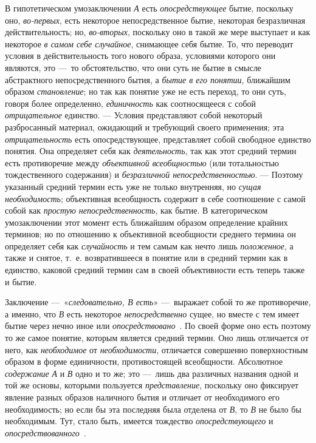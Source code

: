 \documentclass[twoside]{article}
\begin{document}
{{{{{{В гипотетическом умозаключении
{\em А} есть
{\em опосредствующее}
бытие, поскольку оно,
{\em во-первых}, есть
некоторое непосредственное бытие, некоторая безразличная действительность;
но, {\em во-вторых},
поскольку оно в такой же мере выступает и как некоторое
{\em в самом себе случайное},
снимающее себя бытие. То, что переводит условия в
действительность того нового образа, условиями которого они являются, это
—~то обстоятельство, что они суть не бытие в смысле
абстрактного непосредственного бытия, а
{\em бытие в его понятии},
ближайшим образом
{\em становление}; но так
как понятие уже не есть переход, то они суть, говоря более определенно,
{\em единичность} как
соотносящееся с собой
{\em отрицательное}
единство. — Условия
представляют собой некоторый разбросанный материал,
ожидающий и требующий своего применения; эта
{\em отрицательность}
есть опосредствующее, представляет собой свободное единство
понятия. Она определяет себя как
{\em деятельность}, так
как этот средний термин есть противоречие между
{\em объективной всеобщностью}
(или тотальностью тождественного содержания) и
{\em безразличной непосредственностью}.
— Поэтому указанный средний термин есть уже не только
внутренняя, но {\em сущая
необходимость}; объективная всеобщность содержит в себе
соотношение с самой собой как
{\em простую непосредственность},
как бытие. В категорическом умозаключении этот момент есть
ближайшим образом определение крайних терминов; но по отношению к
объективной всеобщности среднего термина он определяет себя как
{\em случайность} и тем
самым как нечто лишь {\em положенное},
а также и снятое, т.~е. возвратившееся в понятие или в
средний термин как в единство, каковой средний термин сам в своей
объективности есть теперь также и бытие.

Заключение
—~«{\em следовательно, В есть}»
—~выражает собой то же противоречие, а именно, что
{\em В} есть некоторое
{\em непосредственно}
сущее, но вместе с тем имеет бытие через нечно иное или
{\em опосредствовано}~\label{bkm:bm61}.
По своей форме оно есть поэтому то же самое понятие, которым
является средний термин. Оно лишь отличается от него, как
{\em необходимое} от
{\em необходимости},
отличается совершенно поверхностным образом в форме
единичности, противостоящей всеобщности. Абсолютное
{\em содержание}
{\em А} и
{\em В} одно и то же;
это —~лишь два различных названия одной и той же основы,
которыми пользуется
{\em представление},
поскольку оно фиксирует явление разных образов наличного
бытия и отличает от необходимого его необходимость; но если бы эта
последняя была отделена от {\em В},
то {\em В}
не было бы необходимым. Тут, стало быть, имеется тождество
{\em опосредствующего} и
{\em опосредствованного}~\label{bkm:bm62}.


}}}}}}
\end{document}
